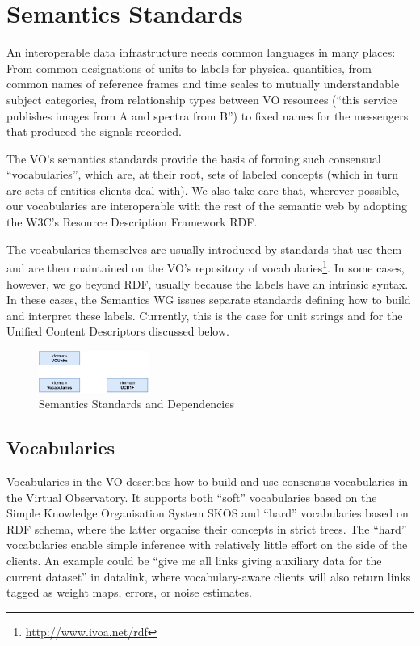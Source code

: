 \documentclass[11pt,letter]{ivoa}
\begin{document}
\section{Semantics Standards}

An interoperable data infrastructure needs common languages in many
places: From common designations of units to labels for physical
quantities, from common names of reference frames and time scales to
mutually understandable subject categories, from relationship types
between VO resources (``this service publishes images from A and spectra from B'') to fixed names for the messengers that produced the signals
recorded.

The VO's semantics standards provide the basis of forming such
consensual ``vocabularies'', which are, at their root, sets of labeled
concepts (which in turn are sets of entities clients deal with).  We
also take care that, wherever possible, our vocabularies are
interoperable with the rest of the semantic web by adopting the W3C's
Resource Description Framework RDF.

The vocabularies themselves are usually introduced by standards that use them and are then maintained on the VO's repository of
vocabularies\footnote{\url{http://www.ivoa.net/rdf}}.  In some cases,
however, we go beyond RDF, usually because the labels have an intrinsic
syntax.  In these cases, the Semantics WG issues separate standards
defining how to build and interpret these labels.  Currently, this is
the case for unit strings and for the Unified Content Descriptors
discussed below.

\begin{figure}[ht]
\centering
\includegraphics[width=0.32\textwidth]{ivoa-arch-semantics.pdf}
\caption{Semantics Standards and Dependencies}
\label{fig:semdeps}
\end{figure}

\subsection{Vocabularies}

Vocabularies in the VO \citep{2021ivoa.spec.0206D} describes how to
build and use
consensus vocabularies in the Virtual Observatory.  It supports both
``soft'' vocabularies based on the Simple Knowledge Organisation System
SKOS and ``hard'' vocabularies based on RDF schema, where the latter
organise their concepts in strict trees.  The ``hard'' vocabularies
enable simple inference with relatively little effort on the side of
the clients.  An example could be ``give me all links giving auxiliary
data for the current dataset'' in datalink, where vocabulary-aware
clients will also return links tagged as weight maps, errors, or noise
estimates.
\end{document}
